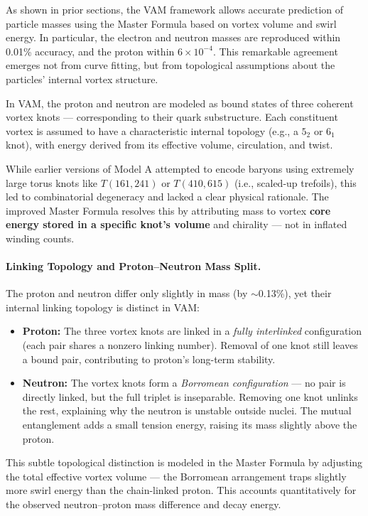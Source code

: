 As shown in prior sections, the VAM framework allows accurate prediction of particle masses using the Master Formula based on vortex volume and swirl energy. In particular, the electron and neutron masses are reproduced within 0.01\% accuracy, and the proton within $6 \times 10^{-4}$. This remarkable agreement emerges not from curve fitting, but from topological assumptions about the particles’ internal vortex structure.

In VAM, the proton and neutron are modeled as bound states of three coherent vortex knots — corresponding to their quark substructure. Each constituent vortex is assumed to have a characteristic internal topology (e.g., a $5_2$ or $6_1$ knot), with energy derived from its effective volume, circulation, and twist.

While earlier versions of Model A attempted to encode baryons using extremely large torus knots like $T(161,241)$ or $T(410,615)$ (i.e., scaled-up trefoils), this led to combinatorial degeneracy and lacked a clear physical rationale. The improved Master Formula resolves this by attributing mass to vortex \textbf{core energy stored in a specific knot’s volume} and chirality — not in inflated winding counts.

\paragraph{Linking Topology and Proton–Neutron Mass Split.}

The proton and neutron differ only slightly in mass (by $\sim$0.13\%), yet their internal linking topology is distinct in VAM:

\begin{itemize}
    \item \textbf{Proton:} The three vortex knots are linked in a \emph{fully interlinked} configuration (each pair shares a nonzero linking number). Removal of one knot still leaves a bound pair, contributing to proton’s long-term stability.

    \item \textbf{Neutron:} The vortex knots form a \emph{Borromean configuration} — no pair is directly linked, but the full triplet is inseparable. Removing one knot unlinks the rest, explaining why the neutron is unstable outside nuclei. The mutual entanglement adds a small tension energy, raising its mass slightly above the proton.
\end{itemize}

This subtle topological distinction is modeled in the Master Formula by adjusting the total effective vortex volume — the Borromean arrangement traps slightly more swirl energy than the chain-linked proton. This accounts quantitatively for the observed neutron–proton mass difference and decay energy.

